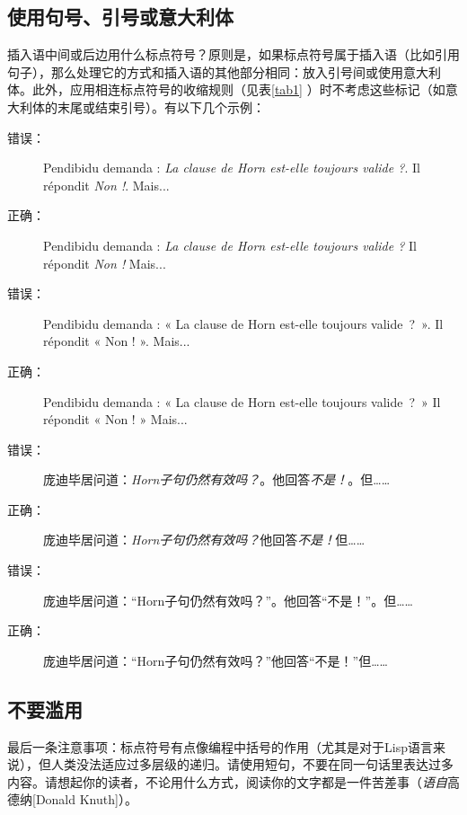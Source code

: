 \subsection{使用句号、引号或意大利体}

插入语中间或后边用什么标点符号？原则是，如果标点符号属于插入语（比如引用句子），那么处理它的方式和插入语的其他部分相同：放入引号间或使用意大利体。此外，应用相连标点符号的收缩规则（见表\ref{tab1}%
）时不考虑这些标记（如意大利体的末尾或结束引号）。有以下几个示例：

\begin{description}
    \item[错误：] Pendibidu demanda : \emph{La clause de Horn est-elle toujours valide ?}. Il répondit \emph{Non !}. Mais...
    \item[正确：] Pendibidu demanda : \emph{La clause de Horn est-elle toujours valide ?} Il répondit \emph{Non !} Mais...
    \item[错误：] Pendibidu demanda : « La clause de Horn est-elle toujours valide~?~». Il répondit « Non ! ». Mais...
    \item[正确：] Pendibidu demanda : « La clause de Horn est-elle toujours valide~?~» Il répondit « Non ! » Mais...
\end{description}

\begin{bil}
    \begin{description}
        \item[错误：]  庞迪毕居问道：\emph{Horn子句仍然有效吗？}。他回答\emph{不是！}。但……
        \item[正确：] 庞迪毕居问道：\emph{Horn子句仍然有效吗？}他回答\emph{不是！}但……
        \item[错误：] 庞迪毕居问道：“Horn子句仍然有效吗？”。他回答“不是！”。但……
        \item[正确：] 庞迪毕居问道：“Horn子句仍然有效吗？”他回答“不是！”但……
    \end{description}
\end{bil}

\subsection{不要滥用}

最后一条注意事项：标点符号有点像编程中括号的作用（尤其是对于Lisp语言来说），但人类没法适应过多层级的递归。请使用短句，不要在同一句话里表达过多内容。请想起你的读者，不论用什么方式，阅读你的文字都是一件苦差事（\emph{语自}高德纳[Donald Knuth]）。